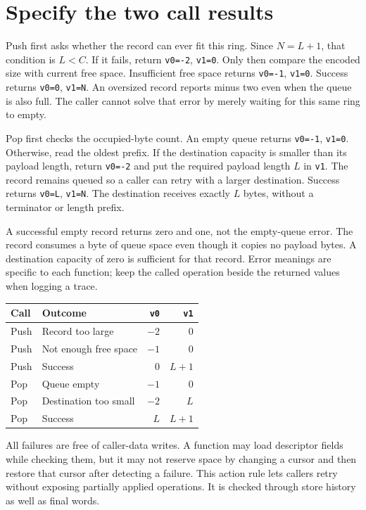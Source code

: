 \section{Specify the two call results}
Push first asks whether the record can ever fit this ring. Since \(N=L+1\), that
condition is \(L<C\). If it fails, return \texttt{v0=-2}, \texttt{v1=0}. Only then
compare the encoded size with current free space. Insufficient free space returns
\texttt{v0=-1}, \texttt{v1=0}. Success returns \texttt{v0=0}, \texttt{v1=N}.
An oversized record reports minus two even when the queue is also full. The caller
cannot solve that error by merely waiting for this same ring to empty.

Pop first checks the occupied-byte count. An empty queue returns
\texttt{v0=-1}, \texttt{v1=0}. Otherwise, read the oldest prefix. If the destination
capacity is smaller than its payload length, return \texttt{v0=-2} and put the
required payload length \(L\) in \texttt{v1}. The record remains queued so a caller
can retry with a larger destination. Success returns \texttt{v0=L}, \texttt{v1=N}.
The destination receives exactly \(L\) bytes, without a terminator or length prefix.

A successful empty record returns zero and one, not the empty-queue error. The
record consumes a byte of queue space even though it copies no payload bytes.
A destination capacity of zero is sufficient for that record. Error meanings are
specific to each function; keep the called operation beside the returned values
when logging a trace.

\begin{longtable}{llrr}
  \toprule Call & Outcome               & \texttt{v0} & \texttt{v1} \\\midrule
  Push          & Record too large      & \(-2\)      & 0           \\
  Push          & Not enough free space & \(-1\)      & 0           \\
  Push          & Success               & 0           & \(L+1\)     \\
  Pop           & Queue empty           & \(-1\)      & 0           \\
  Pop           & Destination too small & \(-2\)      & \(L\)       \\
  Pop           & Success               & \(L\)       & \(L+1\)     \\\bottomrule
\end{longtable}
All failures are free of caller-data writes. A function may load descriptor fields
while checking them, but it may not reserve space by changing a cursor and then
restore that cursor after detecting a failure. This action rule lets callers retry
without exposing partially applied operations. It is checked through store history
as well as final words.
